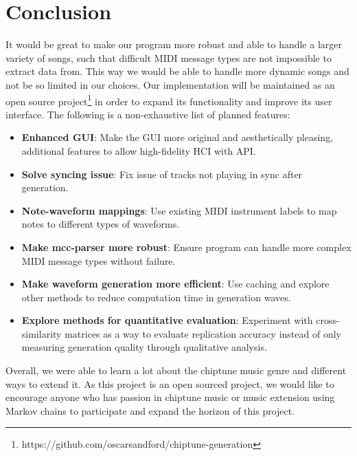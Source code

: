 \documentclass{article}
\begin{document}
\section{Conclusion} 
It would be great to make our program more robust and able to handle a larger variety of songs, such that difficult MIDI message types are not impossible to extract
data from. This way we would be able to handle more dynamic songs and not be so limited in our choices. Our implementation will be maintained as an open source 
project\footnote{https://github.com/oscarsandford/chiptune-generation} in order to expand its functionality and improve its user interface. The following is a non-exhaustive 
list of planned features:
\begin{itemize}
  \item \textbf{Enhanced GUI}: Make the GUI more original and aesthetically pleasing, additional features to allow high-fidelity HCI with API.
  \item \textbf{Solve syncing issue}: Fix issue of tracks not playing in sync after generation.
  \item \textbf{Note-waveform mappings}: Use existing MIDI instrument labels to map notes to different types of waveforms.
  \item \textbf{Make mcc-parser more robust}: Ensure program can handle more complex MIDI message types without failure.
  \item \textbf{Make waveform generation more efficient}: Use caching and explore other methods to reduce computation time in generation waves.
  \item \textbf{Explore methods for quantitative evaluation}: Experiment with cross-similarity matrices as a way to evaluate replication accuracy instead of only measuring 
  generation quality through qualitative analysis. 
\end{itemize}
Overall, we were able to learn a lot about the chiptune music genre and different ways to extend it. As this project is an open sourced project, we would like to encourage
anyone who has passion in chiptune music or music extension using Markov chains to participate and expand the horizon of this project.


\end{document}
